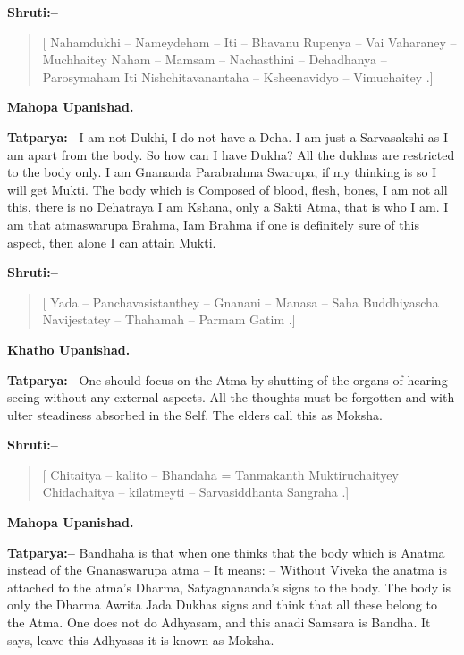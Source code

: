\textbf{Shruti:–}

\begin{verse}
[ Nahamdukhi – Nameydeham – Iti – Bhavanu Rupenya – Vai Vaharaney – Muchhaitey Naham – Mamsam – Nachasthini – Dehadhanya – Parosymaham  Iti Nishchitavanantaha – Ksheenavidyo – Vimuchaitey .]
\end{verse}

\begin{flushright}
\textbf{Mahopa Upanishad.}
\end{flushright}

\textbf{Tatparya:–} I am not Dukhi, I do not have a Deha. I am just a Sarvasakshi as I am apart from the body. So how can I have Dukha? All the dukhas are restricted to the body only. I am Gnananda Parabrahma Swarupa, if my thinking is so I will get Mukti. The body which is Composed of blood, flesh, bones, I am not all this, there is no Dehatraya I am Kshana, only a Sakti Atma, that is who I am. I am that atmaswarupa Brahma, Iam Brahma if one is definitely sure of this aspect, then alone I can attain Mukti.

\textbf{Shruti:–}

\begin{verse}
[ Yada – Panchavasistanthey – Gnanani – Manasa – Saha  Buddhiyascha Navijestatey – Thahamah – Parmam Gatim .]
\end{verse}

\begin{flushright}
\textbf{Khatho Upanishad.}
\end{flushright}

\textbf{Tatparya:–} One should focus on the Atma by shutting of the organs of hearing seeing without any external aspects. All the thoughts must be forgotten and with ulter steadiness absorbed in the Self. The elders call this as Moksha.

\textbf{Shruti:–}

\begin{verse}
[ Chitaitya – kalito – Bhandaha = Tanmakanth Muktiruchaityey  Chidachaitya – kilatmeyti – Sarvasiddhanta Sangraha .]
\end{verse}

\begin{flushright}
\textbf{Mahopa Upanishad.}
\end{flushright}

\textbf{Tatparya:–} Bandhaha is that when one thinks that the body which is Anatma instead of the Gnanaswarupa atma – It means: – Without Viveka the anatma is attached to the atma's Dharma, Satyagnananda's signs to the body. The body is only the Dharma Awrita Jada Dukhas signs and think that all these belong to the Atma. One does not do Adhyasam, and this anadi Samsara is Bandha. It says, leave this Adhyasas it is known as Moksha.

